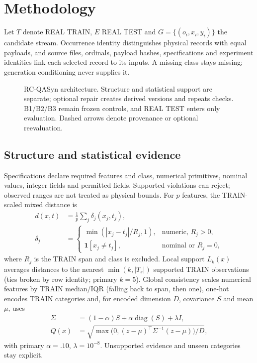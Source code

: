 \section{Methodology}
Let $T$ denote REAL TRAIN, $E$ REAL TEST and $G=\{(o_i,x_i,y_i)\}$ the candidate stream. Occurrence identity distinguishes physical records with equal payloads, and source files, ordinals, payload hashes, specifications and experiment identities link each selected record to its inputs. A missing class stays missing; generation conditioning never supplies it.

\begin{figure}[!t]\centering\resizebox{\textwidth}{!}{}
\caption{RC-QASyn architecture. Structure and statistical support are separate; optional repair creates derived versions and repeats checks. B1/B2/B3 remain frozen controls, and REAL TEST enters only evaluation. Dashed arrows denote provenance or optional reevaluation.}\label{fig:architecture}\end{figure}

\subsection{Structure and statistical evidence}
Specifications declare required features and class, numerical primitives, nominal values, integer fields and permitted fields. Supported violations can reject; observed ranges are not treated as physical bounds. For $p$ features, the TRAIN-scaled mixed distance is
\begin{equation}
\begin{aligned}
d(x,t)&=\frac1p\sum_j\delta_j(x_j,t_j),\\
\delta_j&=\begin{cases}\min(|x_j-t_j|/R_j,1),&\text{numeric, }R_j>0,\\
\mathbf1[x_j\ne t_j],&\text{nominal or }R_j=0,
\end{cases}
\end{aligned}
\end{equation}
where $R_j$ is the TRAIN span and class is excluded. Local support $L_k(x)$ averages distances to the nearest $\min(k,|T_s|)$ supported TRAIN observations (ties broken by row identity; primary $k=5$). Global consistency scales numerical features by TRAIN median/IQR (falling back to span, then one), one-hot encodes TRAIN categories and, for encoded dimension $D$, covariance $S$ and mean $\mu$, uses
\begin{equation}
\begin{aligned}
\Sigma&=(1-\alpha)S+\alpha\operatorname{diag}(S)+\lambda I,\\
Q(x)&=\sqrt{\max\bigl(0,(z-\mu)^\top\Sigma^{-1}(z-\mu)\bigr)/D},
\end{aligned}
\end{equation}
with primary $\alpha=.10$, $\lambda=10^{-8}$. Unsupported evidence and unseen categories stay explicit.

